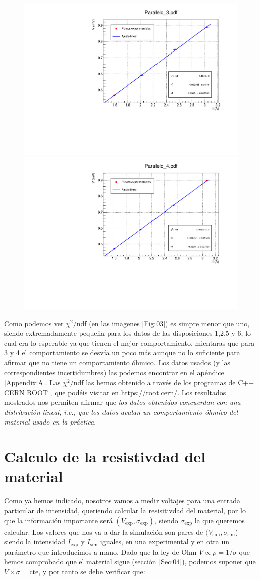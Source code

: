 \documentclass[11pt]{article}
\newcommand{\cte}{\text{cte}}
\newcommand{\simu}{\text{sim}}
\begin{document}
\begin{figure}[h!]
	\includegraphics[width=0.5\linewidth]{Programas/Paralelo_3.pdf} \hfill
	\includegraphics[width=0.5\linewidth]{Programas/Paralelo_4.pdf}
\end{figure}

Como podemos ver $\chi^2/$ndf (en las imagenes \ref{Fig:03}) es simpre menor que uno, siendo extremadamente pequeña para los datos de las disposiciones 1,2,5 y 6, lo cual era lo esperable ya que tienen el mejor comportamiento, mientaras que para 3 y 4 el comportamiento se desvía un poco más aunque no lo suficiente para afirmar que no tiene un comportamiento óhmico. Los datos usados (y las correspondientes incertidumbres) las podemos encontrar en el apéndice \ref{Appendix:A}. Las $\chi^2/$ndf las hemos obtenido a través de los programas de C++ CERN ROOT \cite{Root}, que podéis visitar en \url{https://root.cern/}. Los resultados mostrados nos permiten afirmar que \textit{los datos obtenidos concuerdan con una distribución lineal, i.e., que los datos avalan un comportamiento óhmico del material usado en la práctica}.



\section{Calculo de la resistivdad del material}

Como ya hemos indicado, nosotros vamos a medir voltajes para una entrada particular de intensidad, queriendo calcular la resisitivdad del material, por lo que la información importante será $(V_{\exp},\sigma_{\exp})$, siendo $\sigma_{\exp}$ la que queremos calcular. Los valores que nos va a dar la simulación son pares de $(V_{\simu},\sigma_{\simu}$) siendo la intensidad $I_{\exp}$ y $I_{\simu}$ iguales, en una experimental y en otra un parámetro que introducimos a mano. Dado que la ley de Ohm $V\varpropto \rho = 1 / \sigma$ que hemos comprobado que el material sigue (sección \ref{Sec:04}), podemos suponer que $V\times \sigma = \cte$, y por tanto se debe verificar que: 
\end{document}
